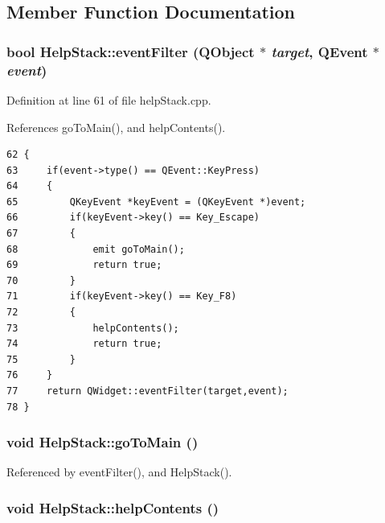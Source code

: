 \subsection{Member Function Documentation}
\hypertarget{classHelpStack_d0}{
\subsubsection[eventFilter]{\setlength{\rightskip}{0pt plus 5cm}bool Help\-Stack::event\-Filter (QObject $\ast$ {\em target}, QEvent $\ast$ {\em event})}}
\label{classHelpStack_d0}


Definition at line 61 of file help\-Stack.cpp.

References go\-To\-Main(), and help\-Contents().

\footnotesize\begin{verbatim}62 {
63     if(event->type() == QEvent::KeyPress)
64     {
65         QKeyEvent *keyEvent = (QKeyEvent *)event;
66         if(keyEvent->key() == Key_Escape)
67         {
68             emit goToMain();
69             return true;
70         }
71         if(keyEvent->key() == Key_F8)
72         {
73             helpContents();
74             return true;
75         }
76     }
77     return QWidget::eventFilter(target,event);
78 }
\end{verbatim}\normalsize 


\hypertarget{classHelpStack_l0}{
\subsubsection[goToMain]{\setlength{\rightskip}{0pt plus 5cm}void Help\-Stack::go\-To\-Main ()}}
\label{classHelpStack_l0}




Referenced by event\-Filter(), and Help\-Stack().\hypertarget{classHelpStack_k0}{
\subsubsection[helpContents]{\setlength{\rightskip}{0pt plus 5cm}void Help\-Stack::help\-Contents ()}}
\label{classHelpStack_k0}


